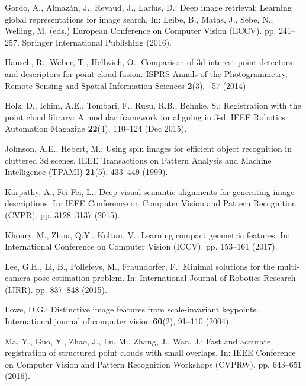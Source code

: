 \documentclass[runningheads]{llncs}
\begin{document}
\begin{thebibliography}{10}
Gordo, A., Almaz{\'a}n, J., Revaud, J., Larlus, D.: Deep image retrieval:
  Learning global representations for image search. In: Leibe, B., Matas, J.,
  Sebe, N., Welling, M. (eds.) European Conference on Computer Vision (ECCV).
  pp. 241--257. Springer International Publishing (2016).

H{\"a}nsch, R., Weber, T., Hellwich, O.: Comparison of 3d interest point
  detectors and descriptors for point cloud fusion. ISPRS Annals of the
  Photogrammetry, Remote Sensing and Spatial Information Sciences
  \textbf{2}(3), ~57 (2014)

Holz, D., Ichim, A.E., Tombari, F., Rusu, R.B., Behnke, S.: Registration with
  the point cloud library: A modular framework for aligning in 3-d. IEEE
  Robotics Automation Magazine  \textbf{22}(4),  110--124 (Dec 2015).

Johnson, A.E., Hebert, M.: Using spin images for efficient object recognition
  in cluttered 3d scenes. IEEE Transactions on Pattern Analysis and Machine
  Intelligence (TPAMI)  \textbf{21}(5),  433--449 (1999).

Karpathy, A., Fei-Fei, L.: Deep visual-semantic alignments for generating image
  descriptions. In: IEEE Conference on Computer Vision and Pattern Recognition
  (CVPR). pp. 3128--3137 (2015). 

Khoury, M., Zhou, Q.Y., Koltun, V.: Learning compact geometric features. In:
  International Conference on Computer Vision (ICCV). pp. 153--161 (2017).

Lee, G.H., Li, B., Pollefeys, M., Fraundorfer, F.: Minimal solutions for the
  multi-camera pose estimation problem. In: International Journal of Robotics
  Research (IJRR). pp. 837--848 (2015). 

Lowe, D.G.: Distinctive image features from scale-invariant keypoints.
  International journal of computer vision  \textbf{60}(2),  91--110 (2004).

Ma, Y., Guo, Y., Zhao, J., Lu, M., Zhang, J., Wan, J.: Fast and accurate
  registration of structured point clouds with small overlaps. In: IEEE
  Conference on Computer Vision and Pattern Recognition Workshops (CVPRW). pp.
  643--651 (2016). 


\end{thebibliography}
\end{document}
